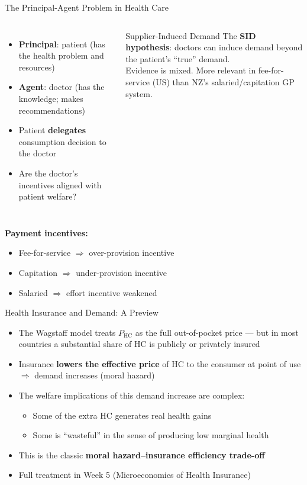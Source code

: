 \documentclass[aspectratio=169, 12pt]{beamer}
\begin{document}
\begin{frame}{The Principal-Agent Problem in Health Care}
  \begin{columns}
      \begin{itemize}
        \item \textbf{Principal}: patient (has the health problem and resources)
        \item \textbf{Agent}: doctor (has the knowledge; makes recommendations)
        \item Patient \textbf{delegates} consumption decision to the doctor
        \item Are the doctor's incentives aligned with patient welfare?
      \end{itemize}
      \begin{alertblock}{Supplier-Induced Demand}
        \small The \textbf{SID hypothesis}: doctors can induce demand beyond the
        patient's ``true'' demand.\\[0.2em]
        Evidence is mixed. More relevant in fee-for-service (US) than NZ's
        salaried/capitation GP system.
      \end{alertblock}
  \end{columns}
  \vspace{0.4em}
  \textbf{Payment incentives:}
  \begin{itemize}
    \item Fee-for-service $\Rightarrow$ over-provision incentive
    \item Capitation $\Rightarrow$ under-provision incentive
    \item Salaried $\Rightarrow$ effort incentive weakened
  \end{itemize}
\end{frame}

\begin{frame}{Health Insurance and Demand: A Preview}
  \begin{itemize}
    \item The Wagstaff model treats $P_\text{HC}$ as the full out-of-pocket price --- but in most
          countries a substantial share of HC is publicly or privately insured
    \item Insurance \textbf{lowers the effective price} of HC to the consumer at point of use
          $\Rightarrow$ demand increases (moral hazard)
    \item The welfare implications of this demand increase are complex:
    \begin{itemize}
      \item Some of the extra HC generates real health gains
      \item Some is ``wasteful'' in the sense of producing low marginal health
    \end{itemize}
    \item This is the classic \textbf{moral hazard--insurance efficiency trade-off}
    \item Full treatment in Week 5 (Microeconomics of Health Insurance)
  \end{itemize}
\end{frame}
\end{document}
